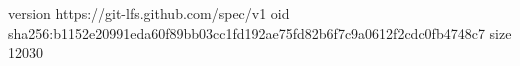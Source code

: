 version https://git-lfs.github.com/spec/v1
oid sha256:b1152e20991eda60f89bb03cc1fd192ae75fd82b6f7c9a0612f2cdc0fb4748c7
size 12030
